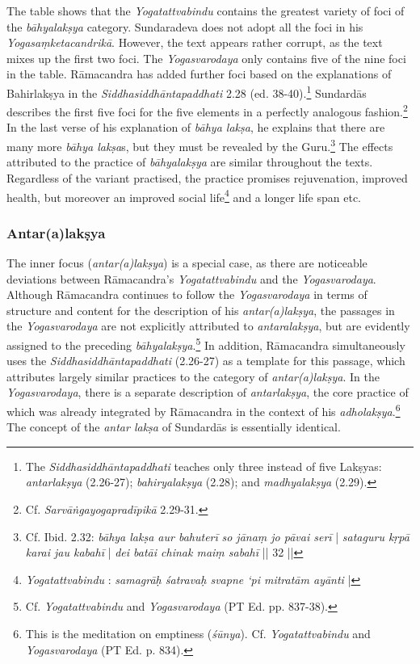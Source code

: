  The table shows that the \textit{Yogatattvabindu} contains the greatest variety of foci of the \textit{bāhyalakṣya} category. Sundaradeva does not adopt all the foci in his \textit{Yogasaṃketacandrikā}. However, the text appears rather corrupt, as the text mixes up the first two foci. The \textit{Yogasvarodaya} only contains five of the nine foci in the table. Rāmacandra has added further foci based on the explanations of Bahirlakṣya in the \textit{Siddhasiddhāntapaddhati} 2.28 (ed. 38-40).\footnote{The \textit{Siddhasiddhāntapaddhati} teaches only three instead of five Lakṣyas: \textit{antarlakṣya} (2.26-27); \textit{bahiryalakṣya} (2.28); and \textit{madhyalakṣya} (2.29).} Sundardās describes the first five foci for the five elements in a perfectly analogous fashion.\footnote{Cf. \textit{Sarvāṅgayogapradīpikā} 2.29-31.} In the last verse of his explanation of \textit{bāhya lakṣa}, he explains that there are many more \textit{bāhya lakṣa}s, but they must be revealed by the Guru.\footnote{Cf. Ibid. 2.32: \textit{bāhya lakṣa aur bahuterī} \textit{so jānaṃ jo pāvai serī} | \textit{sataguru kṛpā karai jau kabahī} | \textit{dei batāi chinak maiṃ sabahī} || 32 ||}
The effects attributed to the practice of \textit{bāhyalakṣya} are similar throughout the texts. Regardless of the variant practised, the practice promises rejuvenation, improved health, but moreover an improved social life\footnote{\textit{Yogatattvabindu} : \textit{samagrāḥ śatravaḥ svapne ‘pi mitratām ayānti} |} and a longer life span etc. 

\subsubsection{Antar(a)lakṣya}
\label{antaralaksya}
The inner focus (\textit{antar(a)lakṣya}) is a special case, as there are noticeable deviations between Rāmacandra’s \textit{Yogatattvabindu} and the \textit{Yogasvarodaya}. Although Rāmacandra continues to follow the \textit{Yogasvarodaya} in terms of structure and content for the description of his \textit{antar(a)lakṣya}, the passages in the \textit{Yogasvarodaya} are not explicitly attributed to \textit{antaralakṣya}, but are evidently assigned to the preceding \textit{bāhyalakṣya}.\footnote{Cf. \textit{Yogatattvabindu}  and \textit{Yogasvarodaya} (PT Ed. pp. 837-38).} In addition, Rāmacandra simultaneously uses the \textit{Siddhasiddhāntapaddhati} (2.26-27) as a template for this passage, which attributes largely similar practices to the category of \textit{antar(a)lakṣya}. In the \textit{Yogasvarodaya}, there is a separate description of \textit{antarlakṣya}, the core practice of which was already integrated by Rāmacandra in the context of his \textit{adholakṣya}.\footnote{This is the meditation on emptiness (\textit{śūnya}). Cf. \textit{Yogatattvabindu}  and \textit{Yogasvarodaya} (PT Ed. p. 834).} 
The concept of the \textit{antar lakṣa} of Sundardās is essentially identical.

